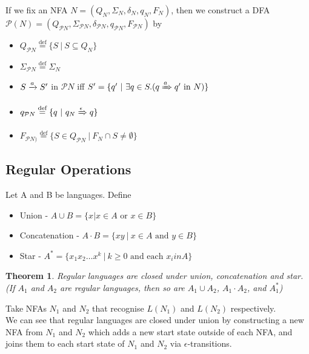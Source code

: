\documentclass{article}
\newtheorem{thm}{Theorem}
\newcommand{\Trans}[3]{ #1 \xrightarrow{ #2 }\mathrel{\vphantom{\to}} #3 }
\newcommand{\dTrans}[3]{ #1 \xRightarrow{ #2 }\mathrel{\vphantom{\to}} #3 }
\newcommand{\eqdef}[0]{ \overset{\text{def}}{=} }
\begin{document}
    If we fix an NFA $N = (Q_N, \Sigma_N, \delta_N, q_N, F_N)$, then we construct a DFA $\mathcal{P}(N) = (Q_{\mathcal{P}N}, \Sigma_{\mathcal{P}N}, \delta_{\mathcal{P}N}, q_{\mathcal{P}N}, F_{\mathcal{P}N})$ by
    \begin{itemize}
        \item $Q_{\mathcal{P}N} \eqdef \{ S \ | \ S \subseteq Q_N \}$
        \item $\Sigma_{\mathcal{P}N} \eqdef \Sigma_N$
        \item $\Trans{S}{a}{S'}$ in $\mathcal{P}N$ iff $S' = \{ q' \ | \ \exists q \in S.( \dTrans{q}{a}{q'} \text{ in } N) \}$
        \item $q_{\mathcal{P}N} \eqdef \{ q \ | \ \dTrans{q_N}{\epsilon}{q}\}$
        \item $F_{\mathcal{P}N)} \eqdef \{ S \in Q_{\mathcal{P}N} \ | \ F_N \cap S \neq \emptyset \} $
    \end{itemize}
    
    
    \subsection{Regular Operations}

    Let A and B be languages. Define 
    \begin{itemize}
        \item Union - $A \cup B = \{ x | x \in A \text{ or } x \in B \}$ 
        \item Concatenation - $A \cdot B = \{ xy \ | \ x \in A \text{ and } y \in B \}$ 
        \item Star - $A^* = \{ x_1 x_2 \ldots x^k \ |  \ k \geq 0 \text{ and each } x_i in A \}   $
    \end{itemize}

    \begin{thm}
        Regular languages are closed under union, concatenation and star. (If $A_1$ and $A_2$ are regular languages, then so are $A_1 \cup A_2$, $A_1 \cdot A_2$, and $A_1^*$)
    \end{thm}

    Take NFAs $N_1$ and $N_2$ that recognise $L(N_1)$ and $L(N_2)$ respectively.  \\

    We can see that regular languages are closed under union by constructing a new NFA from $N_1$ and $N_2$ which adds a new start state outside of each NFA, and joins them to each start state of $N_1$ and $N_2$ via $\epsilon$-transitions. 
    
\end{document}
